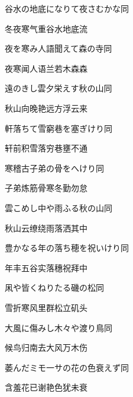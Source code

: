 \begin{haiku}
    {\FH 谷水の地底になりて夜さむかな}\hfill{\FH 同}

    {\FK 冬夜寒气重谷水地底流}
\end{haiku}

\begin{haiku}
    {\FH 夜を寒み人語聞えて森の寺}\hfill{\FH 同}

    {\FK 夜寒闻人语兰若木森森}
\end{haiku}

\begin{haiku}
    {\FH 遠のきし雲夕栄えす秋の山}\hfill{\FH 同}

    {\FK 秋山向晚艳远方浮云来}
\end{haiku}

\begin{haiku}
    {\FH 軒落ちて雪窮巷を塞ぎけり}\hfill{\FH 同}

    {\FK 轩前积雪落穷巷壅不通}
\end{haiku}

\begin{haiku}
    {\FH 寒稽古子弟の骨をへけり}\hfill{\FH 同}

    {\FK 子弟炼筋骨寒冬勤勿怠}
\end{haiku}

\begin{haiku}
    {\FH 雲こめし中や雨ふる秋の山}\hfill{\FH 同}

    {\FK 秋山云缭绕雨落洒其中}
\end{haiku}

\begin{haiku}
    {\FH 豊かなる年の落ち穂を祝いけり}\hfill{\FH 同}

    {\FK 年丰五谷实落穗祝拜中}
\end{haiku}

\begin{haiku}
    {\FH 凩や皆くねりたる磯の松}\hfill{\FH 同}

    {\FK 雪折寒风里群松立矶头}
\end{haiku}

\begin{haiku}
    {\FH 大風に傷みし木々や渡り鳥}\hfill{\FH 同}

    {\FK 候鸟归南去大风万木伤}
\end{haiku}

\begin{haiku}
    {\FH 萎んだミモ一サの花の色衰えず}\hfill{\FH 同}

    {\FK 含羞花已谢艳色犹未衰}
\end{haiku}

